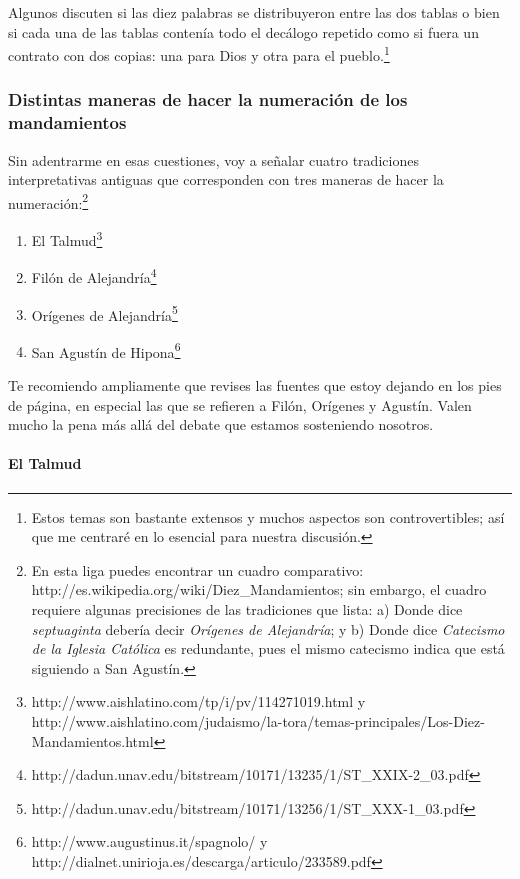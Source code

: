 \documentclass{article}
\begin{document}
Algunos discuten si las diez palabras se distribuyeron entre las dos tablas o bien si cada una de las tablas conten\'{i}a todo el dec\'alogo repetido como si fuera un contrato con dos copias: una para Dios y otra para el pueblo.\footnote{Estos temas son bastante extensos y muchos aspectos son controvertibles; as\'{i} que me centrar\'e en lo esencial para nuestra discusi\'on.}

\subsubsection{Distintas maneras de hacer la numeraci\'on de los mandamientos}

Sin adentrarme en esas cuestiones, voy a se\~nalar cuatro tradiciones interpretativas antiguas que corresponden con tres maneras de hacer la numeraci\'on:\footnote{En esta liga puedes encontrar un cuadro comparativo: http://es.wikipedia.org/wiki/Diez\_Mandamientos; sin embargo, el cuadro requiere algunas precisiones de las tradiciones que lista: a) Donde dice \emph{septuaginta} deber\'{i}a decir \emph{Or\'{i}genes de Alejandr\'{i}a}; y b) Donde dice \emph{Catecismo de la Iglesia Cat\'olica} es redundante, pues el mismo catecismo indica que est\'a siguiendo a San Agust\'{i}n.}

\begin{enumerate}
\item El Talmud\footnote{http://www.aishlatino.com/tp/i/pv/114271019.html y \\ http://www.aishlatino.com/judaismo/la-tora/temas-principales/Los-Diez-Mandamientos.html}
\item Fil\'on de Alejandr\'{i}a\footnote{http://dadun.unav.edu/bitstream/10171/13235/1/ST\_XXIX-2\_03.pdf}
\item Or\'{i}genes de Alejandr\'{i}a\footnote{http://dadun.unav.edu/bitstream/10171/13256/1/ST\_XXX-1\_03.pdf}
\item San Agust\'{i}n de Hipona\footnote{http://www.augustinus.it/spagnolo/ y http://dialnet.unirioja.es/descarga/articulo/233589.pdf}
\end{enumerate}

\noindent
Te recomiendo ampliamente que revises las fuentes que estoy dejando en los pies de p\'agina, en especial las que se refieren a Fil\'on, Or\'{i}genes y Agust\'{i}n. Valen mucho la pena m\'as all\'a del debate que estamos sosteniendo nosotros.

\paragraph{El Talmud}
\end{document}
